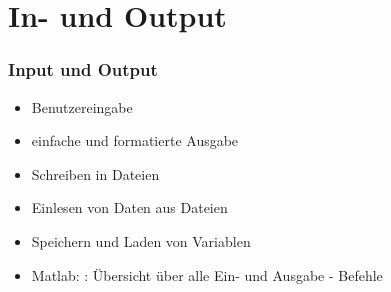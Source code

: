 \documentclass[hyperref={xetex}]{beamer}
\begin{document}
\section{In- und Output}
%
%
\begin{frame}[fragile]\frametitle{Input und Output}
\begin{itemize}
\item Benutzereingabe
\item einfache und formatierte Ausgabe
\item Schreiben in Dateien
\item Einlesen von Daten aus Dateien
\item Speichern und Laden von Variablen\\
\item Matlab: \alert{ }: Übersicht über alle Ein- und  Ausgabe - Befehle
\end{itemize}
\end{frame}
%
%
%
\end{document}
